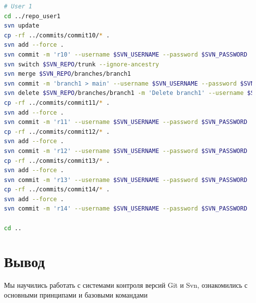 \documentclass[12pt,a4paper]{article}
\begin{document}
\begin{lstlisting}[language=Bash]
# User 1
cd ../repo_user1
svn update
cp -rf ../commits/commit10/* .
svn add --force .
svn commit -m 'r10' --username $SVN_USERNAME --password $SVN_PASSWORD
svn switch $SVN_REPO/trunk --ignore-ancestry
svn merge $SVN_REPO/branches/branch1
svn commit -m 'branch1 > main' --username $SVN_USERNAME --password $SVN_PASSWORD
svn delete $SVN_REPO/branches/branch1 -m 'Delete branch1' --username $SVN_USERNAME --password $SVN_PASSWORD
cp -rf ../commits/commit11/* .
svn add --force .
svn commit -m 'r11' --username $SVN_USERNAME --password $SVN_PASSWORD
cp -rf ../commits/commit12/* .
svn add --force .
svn commit -m 'r12' --username $SVN_USERNAME --password $SVN_PASSWORD
cp -rf ../commits/commit13/* .
svn add --force .
svn commit -m 'r13' --username $SVN_USERNAME --password $SVN_PASSWORD
cp -rf ../commits/commit14/* .
svn add --force .
svn commit -m 'r14' --username $SVN_USERNAME --password $SVN_PASSWORD

cd ..
\end{lstlisting}
\section{Вывод}
Мы научились работать с системами контроля версий Git и Svn, ознакомились с основными принципами и базовыми командами
\end{document}
